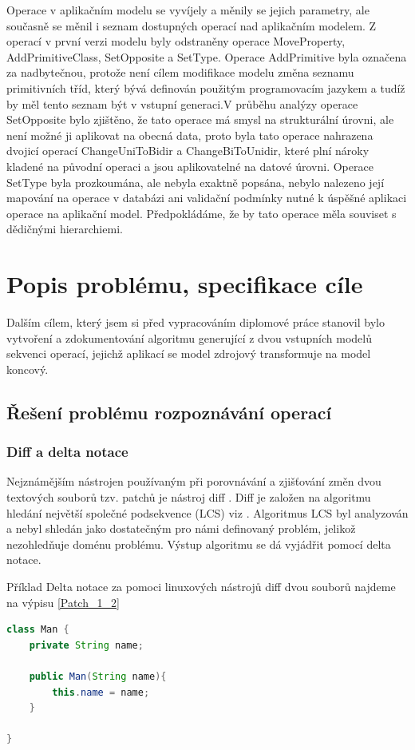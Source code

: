\documentclass[11pt,twoside,a4paper]{book}
\begin{document}
Operace v aplikačním modelu se vyvíjely a měnily se jejich parametry, ale
současně se měnil i seznam dostupných operací nad aplikačním modelem. Z operací
v první verzi modelu byly odstraněny operace MoveProperty, AddPrimitiveClass,
SetOpposite a SetType. Operace AddPrimitive byla označena za nadbytečnou,
protože není cílem modifikace modelu změna seznamu primitivních tříd, který
bývá definován použitým programovacím jazykem a tudíž by měl tento seznam být v
vstupní generaci.V průběhu analýzy operace SetOpposite bylo zjištěno, že tato
operace má smysl na strukturální úrovni, ale není možné ji aplikovat na obecná
data, proto byla tato operace nahrazena dvojicí operací ChangeUniToBidir a
ChangeBiToUnidir, které plní nároky kladené na původní operaci a jsou
aplikovatelné  na datové úrovni. Operace SetType byla prozkoumána, ale nebyla
exaktně popsána, nebylo nalezeno její mapování na operace v databázi ani
validační podmínky nutné k úspěšné aplikaci operace na aplikační model.
Předpokládáme, že by tato operace měla souviset s dědičnými hierarchiemi.



\chapter{Popis problému, specifikace cíle}

Dalším cílem, který jsem si před vypracováním diplomové práce stanovil bylo
vytvoření a zdokumentování algoritmu generující z dvou vstupních modelů
sekvenci operací, jejichž aplikací se model zdrojový transformuje na model
koncový.

\section{Řešení problému rozpoznávání operací}\label{ops_recognition}

\subsection{Diff a delta notace}
Nejznámějším nástrojen používaným při porovnávání a zjišťování změn dvou
textových souborů tzv. patchů \cite{patch} je nástroj diff \cite{diff_wiki} .
Diff je založen na algoritmu hledání největší společné podsekvence (LCS) viz
\cite{wiki_lcs}. Algoritmus LCS byl analyzován a nebyl shledán jako dostatečným
pro námi definovaný problém, jelikož nezohledňuje doménu problému. Výstup
algoritmu se dá vyjádřit pomocí delta notace.

Příklad Delta notace za pomoci linuxových
nástrojů diff dvou souborů najdeme na výpisu \ref{Patch_1_2} \\
\begin{lstlisting}[language=JAVA,frame=single,caption=Man1.java,label=Man1]
class Man {
	private String name;

	public Man(String name){
		this.name = name;
	}

}
\end{lstlisting}
\end{document}
